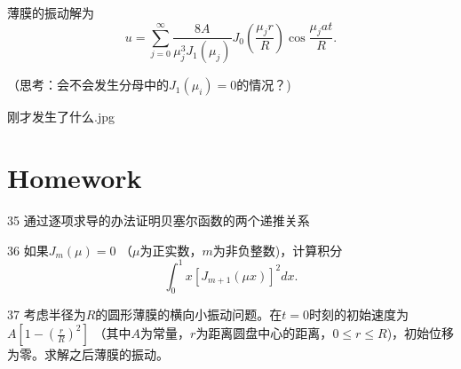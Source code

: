 \documentclass[CJK]{beamer}
\begin{document}
\begin{frame}
  \bch
  薄膜的振动解为
  $$ u = \sum_{j=0}^\infty \frac{8A}{\mu_j^3J_1(\mu_j)}J_0\left( \frac{\mu_jr}{R}\right)\cos\frac{\mu_jat}{R}. $$

  \skiplines

  （思考：会不会发生分母中的$J_1(\mu_i)=0$的情况？)
  \ech
\end{frame}


\begin{frame}
  \bch
  \bcenter

  刚才发生了什么.jpg
  \ecenter
  \ech
\end{frame}


\section{Homework}

\begin{frame}
  \bch
  \bitem
\item[35]{通过逐项求导的办法证明贝塞尔函数的两个递推关系}
\item[36]{如果$J_m(\mu) = 0$ （$\mu$为正实数，$m$为非负整数)，计算积分
    $$\int_0^1x\left[J_{m+1}(\mu x)\right]^2 dx. $$
}
\item[37]{ 考虑半径为$R$的圆形薄膜的横向小振动问题。在$t=0$时刻的初始速度为$A\left[1-\left(\frac{r}{R}\right)^2\right]$ （其中$A$为常量，$r$为距离圆盘中心的距离，$0\le r\le R$)，初始位移为零。求解之后薄膜的振动。
 }
  \eitem
  \ech
\end{frame}
\end{document}
